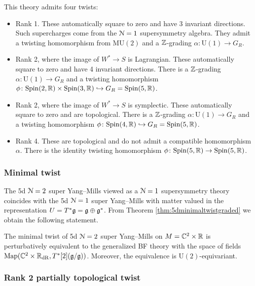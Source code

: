\documentclass[10pt, oneside]{article}
\newcommand{\MU}{\mathrm{MU}}
\renewcommand{\U}{\mathrm{U}}
\begin{document}
This theory admits four twists:
\begin{itemize}
\item Rank 1. These automatically square to zero and have 3 invariant directions. Such supercharges come from the $\mathcal N=1$ supersymmetry algebra. They admit a twisting homomorphism from $\MU(2)$ and a $\mathbb Z$-grading $\alpha\colon \U(1)\rightarrow G_R$.

\item Rank 2, where the image of $W^*\rightarrow S$ is Lagrangian. These automatically square to zero and have 4 invariant directions. There is a $\mathbb Z$-grading $\alpha\colon \U(1)\rightarrow G_R$ and a twisting homomorphism $\phi\colon \mathrm{Spin}(2, \mathbb R)\times \mathrm{Spin}(3, \mathbb R)\hookrightarrow G_R=\mathrm{Spin}(5, \mathbb R)$.

\item Rank 2, where the image of $W^*\rightarrow S$ is symplectic. These automatically square to zero and are topological. There is a $\mathbb Z$-grading $\alpha\colon \U(1)\rightarrow G_R$ and a twisting homomorphism $\phi\colon \mathrm{Spin}(4, \mathbb R)\hookrightarrow G_R=\mathrm{Spin}(5, \mathbb R)$.

\item Rank 4. These are topological and do not admit a compatible homomorphism $\alpha$. There is the identity twisting homomorphism $\phi\colon \mathrm{Spin}(5, \mathbb R)\rightarrow \mathrm{Spin}(5, \mathbb R)$.
\end{itemize}

\subsubsection{Minimal twist}
\label{sect:5dminimaltwist}

The 5d $\mathcal N=2$ super Yang--Mills viewed as a $\mathcal N=1$ supersymmetry theory coincides with the 5d $\mathcal N=1$ super Yang--Mills with matter valued in the representation $U=T^*\mathfrak g=\mathfrak g\oplus \mathfrak g^*$. From Theorem \ref{thm:5dminimaltwistgraded} we obtain the following statement.

\begin{theorem}
The minimal twist of 5d $\mathcal N=2$ super Yang--Mills on $M=\mathbb C^2\times \mathbb R$ is perturbatively equivalent to the generalized BF theory with the space of fields $\operatorname{Map}(\mathbb C^2\times \mathbb R_{\mathrm{dR}}, T^*[2](\mathfrak g/\mathfrak g))$. Moreover, the equivalence is $\U(2)$-equivariant.
\end{theorem}

\subsubsection{Rank 2 partially topological twist}
\label{sect:5dpartialtwist}
\end{document}
